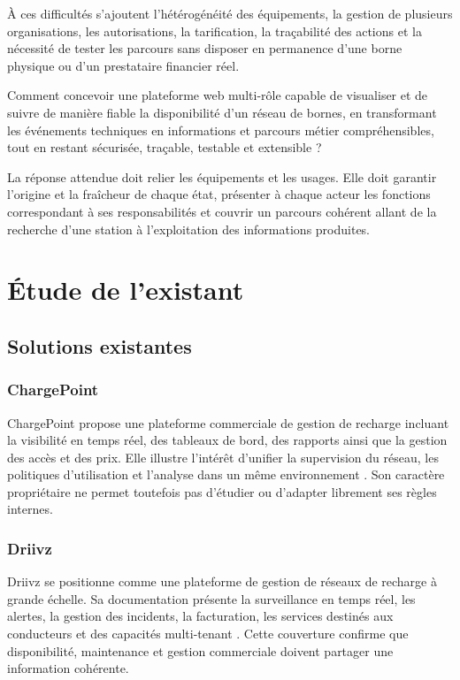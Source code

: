 À ces difficultés s'ajoutent l'hétérogénéité des équipements, la gestion de plusieurs
organisations, les autorisations, la tarification, la traçabilité des actions et la
nécessité de tester les parcours sans disposer en permanence d'une borne physique ou
d'un prestataire financier réel.

\begin{scopebox}
  Comment concevoir une plateforme web multi-rôle capable de visualiser et de suivre
  de manière fiable la disponibilité d'un réseau de bornes, en transformant les
  événements techniques en informations et parcours métier compréhensibles, tout en
  restant sécurisée, traçable, testable et extensible ?
\end{scopebox}

La réponse attendue doit relier les équipements et les usages. Elle doit garantir
l'origine et la fraîcheur de chaque état, présenter à chaque acteur les fonctions
correspondant à ses responsabilités et couvrir un parcours cohérent allant de la
recherche d'une station à l'exploitation des informations produites.

\section{Étude de l'existant}

\subsection{Solutions existantes}

\subsubsection{ChargePoint}

ChargePoint propose une plateforme commerciale de gestion de recharge incluant la
visibilité en temps réel, des tableaux de bord, des rapports ainsi que la gestion des
accès et des prix. Elle illustre l'intérêt d'unifier la supervision du réseau, les
politiques d'utilisation et l'analyse dans un même environnement
\cite{chargePointSoftware}. Son caractère propriétaire ne permet toutefois pas
d'étudier ou d'adapter librement ses règles internes.

\subsubsection{Driivz}

Driivz se positionne comme une plateforme de gestion de réseaux de recharge à grande
échelle. Sa documentation présente la surveillance en temps réel, les alertes, la
gestion des incidents, la facturation, les services destinés aux conducteurs et des
capacités multi-tenant \cite{driivzOperations}. Cette couverture confirme que
disponibilité, maintenance et gestion commerciale doivent partager une information
cohérente.


